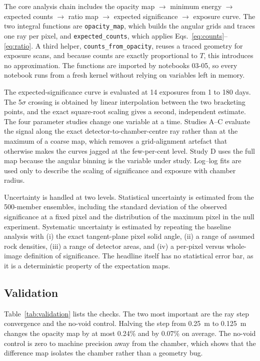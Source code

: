 \documentclass{article}
\begin{document}
The core analysis chain includes the opacity map $\rightarrow$ minimum energy
$\rightarrow$ expected counts $\rightarrow$ ratio map $\rightarrow$ expected
significance $\rightarrow$ exposure curve. The two integral functions are
\texttt{opacity\_map}, which builds the angular grids and traces one ray per
pixel, and \texttt{expected\_counts}, which applies
Eqs.~\eqref{eq:counts}--\eqref{eq:ratio}. A third helper,
\texttt{counts\_from\_opacity}, reuses a traced geometry for exposure scans, and
because counts are exactly proportional to $T$, this introduces no
approximation. The functions are imported by notebooks 03-05, so every
notebook runs from a fresh kernel without relying on variables left in memory.

The expected-significance curve is evaluated at 14 exposures from 1 to 180 days.
The 5$\sigma$ crossing is obtained by linear interpolation between the two
bracketing points, and the exact square-root scaling gives a second, independent
estimate. The four parameter studies change one variable at a time. Studies
A--C evaluate the signal along the exact detector-to-chamber-centre ray rather
than at the maximum of a coarse map, which removes a grid-alignment artefact
that otherwise makes the curves jagged at the few-per-cent level. Study D uses
the full map because the angular binning is the variable under study. Log--log
fits are used only to describe the scaling of significance and exposure with
chamber radius.

Uncertainty is handled at two levels. Statistical uncertainty is estimated from
the 500-member ensembles, including the standard deviation of the observed significance
at a fixed pixel and the distribution of the maximum pixel in the null
experiment. Systematic uncertainty is estimated by repeating the baseline
analysis with (i) the exact tangent-plane pixel solid angle, (ii) a range of
assumed rock densities, (iii) a range of detector areas, and (iv) a per-pixel
versus whole-image definition of significance. The headline itself has no
statistical error bar, as it is a deterministic property of the expectation maps.

\subsection{Validation}

Table~\ref{tab:validation} lists the checks. The two most important are the ray
step convergence and the no-void control. Halving the step from 0.25~m to
0.125~m changes the opacity map by at most 0.24\% and by 0.07\% on average. The
no-void control is zero to machine precision away from the chamber, which shows
that the difference map isolates the chamber rather than a geometry bug.
\end{document}
